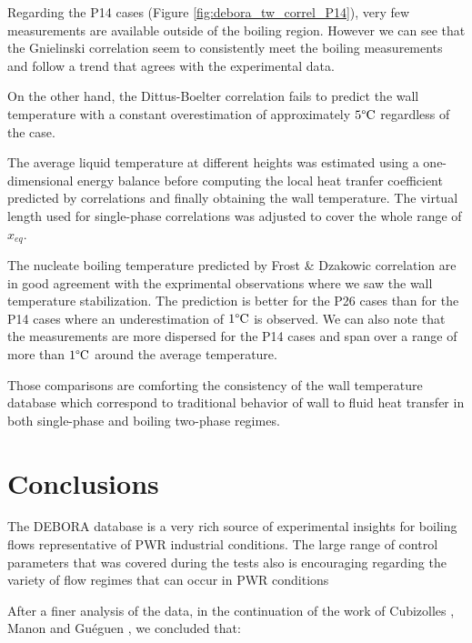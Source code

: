 \npar
Regarding the P14 cases (Figure \ref{fig:debora_tw_correl_P14}), very few measurements are available outside of the boiling region. However we can see that the Gnielinski correlation seem to consistently meet the boiling measurements and follow a trend that agrees with the experimental data.

\npar
On the other hand, the Dittus-Boelter correlation fails to predict the wall temperature with a constant overestimation of approximately $5\degree\mathrm{C}$ regardless of the case. 


\begin{note*}{}
The average liquid temperature at different heights was estimated using a one-dimensional energy balance before computing the local heat tranfer coefficient predicted by correlations and finally obtaining the wall temperature. The virtual length used for single-phase correlations was adjusted to cover the whole range of $x_{eq}$.
\end{note*}

\npar

The nucleate boiling temperature predicted by Frost \& Dzakowic correlation are in good agreement with the exprimental observations where we saw the wall temperature stabilization. The prediction is better for the P26 cases than for the P14 cases where an underestimation of $1\degree\mathrm{C}$ is observed. We can also note that the measurements are more dispersed for the P14 cases and span over a range of more than $1\degree\mathrm{C}$ around the average temperature.

\npar

Those comparisons are comforting the consistency of the wall temperature database which correspond to traditional behavior of wall to fluid heat transfer in both single-phase and boiling two-phase regimes.


\section{Conclusions}

The DEBORA database is a very rich source of experimental insights for boiling flows representative of PWR industrial conditions. The large range of control parameters that was covered during the tests also is encouraging regarding the variety of flow regimes that can occur in PWR conditions

\npar

After a finer analysis of the data, in the continuation of the work of Cubizolles \cite{cubizolles_etude_1996}, Manon \cite{manon_contribution_2000} and Guéguen \cite{gueguen_contribution_2013}, we concluded that:

